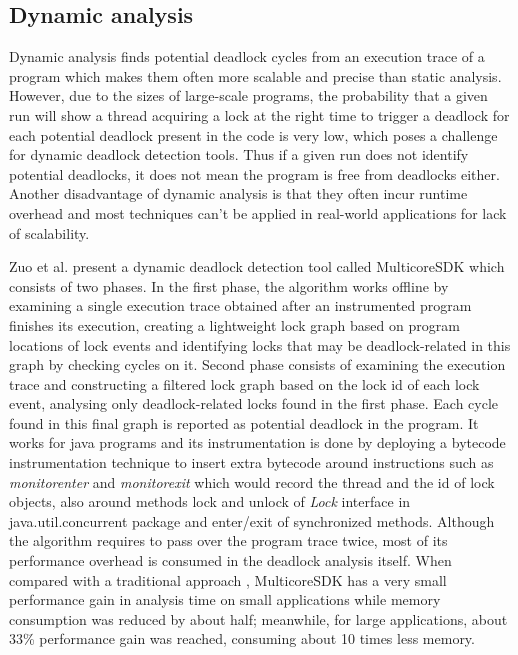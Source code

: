 \subsection{Dynamic analysis}

Dynamic analysis finds potential deadlock cycles from an execution trace of a program which makes them often more scalable and precise than static analysis.
However, due to the sizes of large-scale programs, the probability that a given run will show a thread acquiring a lock at the right time to trigger a deadlock for
each potential deadlock present in the code is very low, which poses a challenge for dynamic deadlock detection tools. Thus if a given run does not identify potential
deadlocks, it does not mean the program is free from deadlocks either. Another disadvantage of dynamic analysis is that they often incur runtime overhead and most techniques
can't be applied in real-world applications for lack of scalability.

Zuo et al. \cite{mcsdk} present a dynamic deadlock detection tool called MulticoreSDK which consists of two phases.
In the first phase, the algorithm works offline by examining a single execution trace obtained after an instrumented program finishes its execution,
creating a lightweight lock graph based on program locations of lock events and identifying locks that may be deadlock-related in this graph by checking cycles on it.
Second phase consists of examining the execution trace and constructing a filtered lock graph based on the lock id of each lock event, analysing only deadlock-related locks
found in the first phase. Each cycle found in this final graph is reported as potential deadlock in the program.
It works for java programs and its instrumentation is done by deploying a bytecode instrumentation technique \cite{tanter} to insert extra bytecode
around instructions such as \emph{monitorenter} and \emph{monitorexit} which would record the thread and the id of lock objects, also around methods lock and unlock of
\emph{Lock} interface in java.util.concurrent package and enter/exit of synchronized methods.
Although the algorithm requires to pass over the program trace twice, most of its performance overhead is consumed in the deadlock analysis itself.
When compared with a traditional approach \cite{contest}, MulticoreSDK has a very small performance gain in analysis time on small applications while memory consumption
was reduced by about half; meanwhile, for large applications, about 33\% performance gain was reached, consuming about 10 times less memory.

